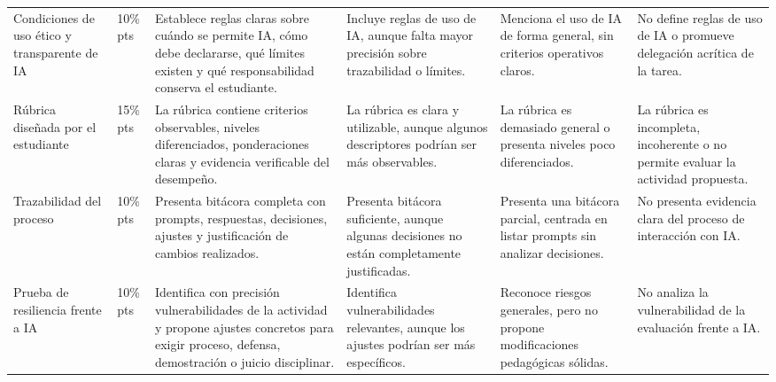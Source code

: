 \documentclass[12pt,letterpaper]{article}
\begin{document}
\begin{landscape}
\begin{longtable}{p{3.1cm} p{2cm} p{3.1cm} p{3.1cm} p{3.1cm} p{3.1cm}}
    \addlinespace

    Condiciones de uso ético y transparente de IA
    & 10\% \newline 10 pts
    & Establece reglas claras sobre cuándo se permite IA, cómo debe
    declararse, qué límites existen y qué responsabilidad conserva el
    estudiante.
    & Incluye reglas de uso de IA, aunque falta mayor precisión sobre
    trazabilidad o límites.
    & Menciona el uso de IA de forma general, sin criterios operativos claros.
    & No define reglas de uso de IA o promueve delegación acrítica de
    la tarea. \\

    \addlinespace

    Rúbrica diseñada por el estudiante
    & 15\% \newline 15 pts
    & La rúbrica contiene criterios observables, niveles diferenciados,
    ponderaciones claras y evidencia verificable del desempeño.
    & La rúbrica es clara y utilizable, aunque algunos descriptores
    podrían ser más observables.
    & La rúbrica es demasiado general o presenta niveles poco diferenciados.
    & La rúbrica es incompleta, incoherente o no permite evaluar la
    actividad propuesta. \\

    \addlinespace

    Trazabilidad del proceso
    & 10\% \newline 10 pts
    & Presenta bitácora completa con prompts, respuestas, decisiones,
    ajustes y justificación de cambios realizados.
    & Presenta bitácora suficiente, aunque algunas decisiones no están
    completamente justificadas.
    & Presenta una bitácora parcial, centrada en listar prompts sin
    analizar decisiones.
    & No presenta evidencia clara del proceso de interacción con IA. \\

    \addlinespace

    Prueba de resiliencia frente a IA
    & 10\% \newline 10 pts
    & Identifica con precisión vulnerabilidades de la actividad y
    propone ajustes concretos para exigir proceso, defensa,
    demostración o juicio disciplinar.
    & Identifica vulnerabilidades relevantes, aunque los ajustes
    podrían ser más específicos.
    & Reconoce riesgos generales, pero no propone modificaciones
    pedagógicas sólidas.
    & No analiza la vulnerabilidad de la evaluación frente a IA. \\


\end{longtable}
\end{landscape}
\end{document}

